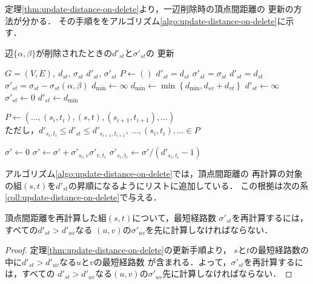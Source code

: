 定理\ref{thm:update-distance-on-delete}より，一辺削除時の頂点間距離の
更新の方法が分かる．
その手順ををアルゴリズム\ref{algo:update-distance-on-delete}に示す．
\begin{algorithm}[H]
  \caption{辺$\{\alpha,\beta\}$が削除されたときの$d'_{st}$と$\sigma'_{st}$の
    更新}\label{algo:update-distance-on-delete}
  \begin{algorithmic}[1]
    \Require $G=(V,E),\ d_{st},\,\sigma_{st}$
    \Ensure $d'_{st},\,\sigma'_{st}$
    \State $P\gets()$
    \State $d'_{st}=d_{st}$
    \State $\sigma'_{st}=\sigma_{st}$
    \State $d'_{st}=d_{st}$
    \State $\sigma'_{st}=\sigma_{st}-\sigma_{st}(\alpha,\beta)$
    \State $d_{\min}\gets \infty$
    \State $d_{\min}\gets\min\left\{d_{\min},d_{sv}+d_{vt}\right\}$
    \EndFor
    \State $d'_{st}\gets\infty$
    \State $\sigma'_{st}\gets0$
    \Else
    \State $d'_{st}\gets d_{\min}$
    \State \parbox[t]{\linewidth}{
      $P\gets(\ldots,(s_i,t_i),(s,t),(s_{i+1},t_{i+1}),\ldots)$ \\
      ただし，$d'_{s_i,t_i}\leq d'_{st}\leq d'_{s_{i+1},t_{i+1}},\ \ldots,(s_i,t_i),\ldots\in P$
    }
    \EndIf
    \EndIf
    \EndFor
    \EndFor
    \State $\sigma'\gets0$
    \State $\sigma'\gets\sigma'+\sigma'_{s_i,v}\sigma'_{v,t_i}$
    \EndFor
    \State $\sigma'_{s_i,t_i}\gets\sigma'/(d'_{s_i,t_i}-1)$
    \EndFor
  \end{algorithmic}
\end{algorithm}

アルゴリズム\ref{algo:update-distance-on-delete}では，頂点間距離の
再計算の対象の組$(s,t)$を$d'_{st}$の昇順になるようにリストに追加している．
この根拠は次の系\ref{coll:update-distance-on-delete}で与える．
\begin{corollary}
  \label{cor:update-distance-on-delete}
  頂点間距離を再計算した組$(s,t)$について，最短経路数
  $\sigma'_{st}$を再計算するには，すべての$d'_{st}>d'_{uv}$なる
  $(u,v)$の$\sigma'_{uv}$を先に計算しなければならない．
\end{corollary}
\begin{proof}
  定理\ref{thm:update-distance-on-delete}の更新手順より，
  $s$と$t$の最短経路数の中に$d'_{st}>d'_{uv}$なる$u$と$v$の最短経路数
  が含まれる．よって，$\sigma'_{st}$を再計算するには，すべての
  $d'_{st}>d'_{uv}$なる$(u,v)$の$\sigma'_{uv}$先に計算しなければならない．
\end{proof}

